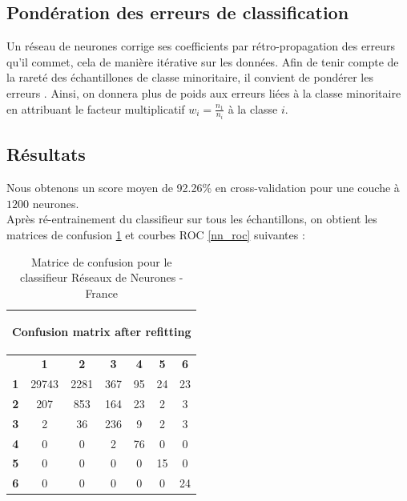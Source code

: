 \documentclass{book}
\begin{document}
\subsection{Pondération des erreurs de classification}

Un réseau de neurones corrige ses coefficients par rétro-propagation des erreurs qu'il commet, cela de manière itérative sur les données. Afin de tenir compte de la rareté des échantillones de classe minoritaire, 
il convient de pondérer les erreurs . Ainsi, on donnera plus de poids aux erreurs liées à la classe minoritaire en attribuant le facteur multiplicatif $w_i=\frac{n_1}{n_i}$ à la classe $i$.\\

\subsection{Résultats}

Nous obtenons un score moyen de 92.26\% en cross-validation pour une couche à $1200$ neurones. \\
Après ré-entrainement du classifieur sur tous les échantillons, on obtient les matrices de confusion \ref{nn_cm} et courbes ROC \ref{nn_roc} suivantes :

\begin{table}[H]
  \begin{center}
\begin{adjustbox}{max width=\textwidth}
  \begin{tabular}{|c|c|c|c|c|c|c|}
    \hline
    \multicolumn{7}{|c|}{{ \begin{bf}Confusion matrix after refitting\end{bf}}} \\
    \hline
     & \textbf{1} & \textbf{2} & \textbf{3} & \textbf{4} & \textbf{5} & \textbf{6}\\
    \hline
    \textbf{1} & 29743 & 2281 & 367 & 95 & 24 & 23\\
    \hline
    \textbf{2} & 207 & 853 & 164 & 23 & 2 & 3\\
    \hline
    \textbf{3} & 2 & 36 & 236 & 9 & 2 & 3\\
    \hline
    \textbf{4} & 0 & 0 & 2 & 76 & 0 & 0\\
    \hline
    \textbf{5} & 0 & 0 & 0 & 0 & 15 & 0\\
    \hline
    \textbf{6} & 0 & 0 & 0 & 0 & 0 & 24\\
    \hline
  \end{tabular}
  \end{adjustbox}
  \caption{Matrice de confusion pour le classifieur Réseaux de Neurones - France}
  \label{nn_cm}
  \end{center}
\end{table}
\end{document}
